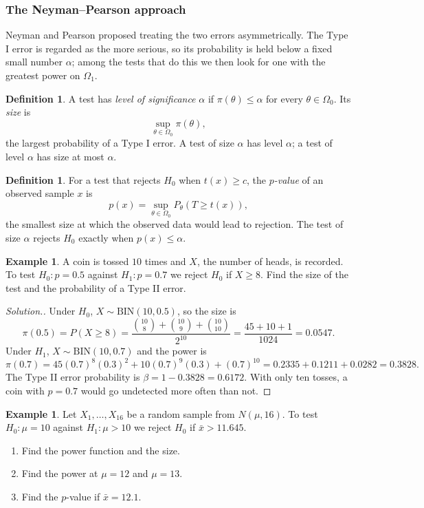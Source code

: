 \documentclass[12pt,a4paper]{report}
\theoremstyle{definition}
\newtheorem{definition}[thm]{Definition}
\newtheorem{example}[thm]{Example}
\theoremstyle{plain}
\newenvironment{solution}
  {\renewcommand{\qedsymbol}{}\begin{proof}[\textit{Solution}.]}
  {\end{proof}}
\begin{document}
\subsubsection{The Neyman--Pearson approach}

Neyman and Pearson proposed treating the two errors asymmetrically. The Type I
error is regarded as the more serious, so its probability is held below a fixed
small number $\alpha$; among the tests that do this we then look for one with the
greatest power on $\Omega_1$.

\begin{definition}
\label{def:size}
A test has \emph{level of significance} $\alpha$ if $\pi(\theta)\le\alpha$ for
every $\theta\in\Omega_0$. Its \emph{size} is
\[\sup_{\theta\in\Omega_0}\pi(\theta) ,\]
the largest probability of a Type I error. A test of size $\alpha$ has level
$\alpha$; a test of level $\alpha$ has size at most $\alpha$.
\end{definition}

\begin{definition}
\label{def:pvalue}
For a test that rejects $H_0$ when $t(x)\ge c$, the \emph{$p$-value} of an
observed sample $x$ is
\[p(x) = \sup_{\theta\in\Omega_0} P_\theta(T\ge t(x)) ,\]
the smallest size at which the observed data would lead to rejection. The test of
size $\alpha$ rejects $H_0$ exactly when $p(x)\le\alpha$.
\end{definition}

\begin{example}
\label{ex:binomialsize}
A coin is tossed $10$ times and $X$, the number of heads, is recorded. To test
$H_0\colon p = 0.5$ against $H_1\colon p = 0.7$ we reject $H_0$ if $X\ge 8$. Find
the size of the test and the probability of a Type II error.
\end{example}

\begin{solution}
Under $H_0$, $X\sim\text{BIN}(10,0.5)$, so the size is
\[\pi(0.5) = P(X\ge 8) = \frac{\binom{10}{8} + \binom{10}{9} + \binom{10}{10}}{2^{10}}
= \frac{45 + 10 + 1}{1024} = 0.0547 .\]
Under $H_1$, $X\sim\text{BIN}(10,0.7)$ and the power is
\[\pi(0.7) = 45(0.7)^8(0.3)^2 + 10(0.7)^9(0.3) + (0.7)^{10}
= 0.2335 + 0.1211 + 0.0282 = 0.3828 .\]
The Type II error probability is $\beta = 1 - 0.3828 = 0.6172$. With only ten
tosses, a coin with $p = 0.7$ would go undetected more often than not.
\end{solution}

\begin{example}
\label{ex:normalpower}
Let $X_1,\dots,X_{16}$ be a random sample from $N(\mu,16)$. To test
$H_0\colon\mu = 10$ against $H_1\colon\mu>10$ we reject $H_0$ if
$\bar x>11.645$.
\begin{enumerate}
\item[(a)] Find the power function and the size.
\item[(b)] Find the power at $\mu = 12$ and $\mu = 13$.
\item[(c)] Find the $p$-value if $\bar x = 12.1$.
\end{enumerate}
\end{example}
\end{document}
